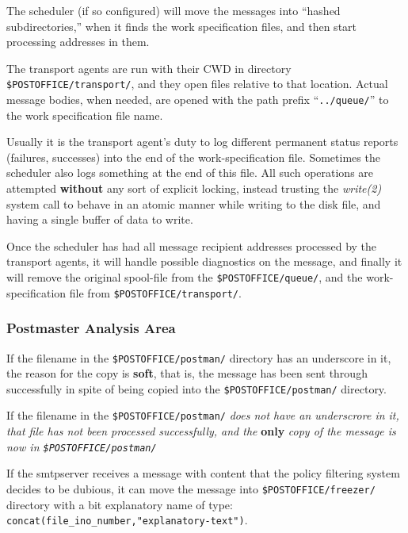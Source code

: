 The scheduler (if so configured) will move the messages into 
``hashed subdirectories,'' when it finds the work specification files, 
and then start processing addresses in them.

The transport agents are run with their CWD in directory 
{\tt \$POSTOFFICE/transport/}, 
and they open files relative to that location. Actual message bodies, when 
needed, are opened with the path prefix ``{\tt ../queue/}'' to the work 
specification file name.

Usually it is the transport agent's duty to log different permanent status reports 
(failures, successes) into the end of the work-specification file.  
Sometimes the scheduler also logs something at the end of this file.  
All such operations are attempted {\bf without} any sort 
of explicit locking, instead trusting the {\em write(2)\/} system call to 
behave in an atomic manner while writing to the disk file, and 
having a single buffer of data to write.

Once the scheduler has had all message recipient addresses 
processed by the transport agents, it will handle possible
diagnostics on the message, and finally it will remove the
original spool-file from the {\tt \$POSTOFFICE/queue/}, and 
the work-specification file from {\tt \$POSTOFFICE/transport/}.




\subsubsection{Postmaster Analysis Area\label{postmaster_analysis_area}}



If the filename in the {\tt \$POSTOFFICE/postman/} directory has an 
underscore in it, the reason for the copy is {\bf soft}, that is, the 
message has been sent through successfully in spite of being copied into
the {\tt \$POSTOFFICE/postman/} directory.

If the filename in the {\tt \$POSTOFFICE/postman/}
{\em does not have an underscrore in it, that file has not been processed
successfully, and the\/} {\bf only} {\em copy of the message
is now in {\tt \$POSTOFFICE/postman/}\/}

If the  smtpserver  receives a message with content that the policy filtering
system decides to be dubious, it can move the message into
{\tt \$POSTOFFICE/freezer/} directory with a bit explanatory name of type:
{\tt concat(file\_ino\_number,"explanatory-text")}.

